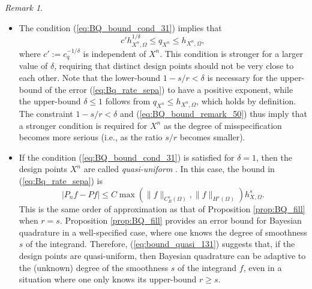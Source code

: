 \documentclass[11pt]{article}
\theoremstyle{remark}
\newtheorem{remark}{Remark}
\theoremstyle{example}
\theoremstyle{remark}
\begin{document}
\begin{remark} \rm
\begin{itemize}
\item The condition (\ref{eq:BQ_bound_cond_31}) implies that
\begin{equation} \label{eq:BQ_bound_remark_50}
c' h_{X^n,\Omega}^{1/\delta} \leq q_{X^n} \leq h_{X^n,\Omega},
\end{equation}
where $c' := c_q^{-1/\delta}$ is independent of $X^n$.
This condition is stronger for a larger value of $\delta$, requiring that distinct design points should not be very close to each other.
Note that the lower-bound $1-s/r<\delta$ is necessary for the upper-bound of the error (\ref{eq:Bq_rate_sepa}) to have a positive exponent, while the upper-bound $\delta \leq 1$ follows from $q_{X^n} \leq h_{X^n,\Omega}$, which holds by definition.
The constraint $1-s/r<\delta$ and (\ref{eq:BQ_bound_remark_50}) thus imply that a stronger condition is required for $X^n$ as the degree of misspecification becomes more serious (i.e., as the ratio $s/r$ becomes smaller).\vspace{-1mm}

\item 
If the condition (\ref{eq:BQ_bound_cond_31}) is satisfied for $\delta = 1$, then the design points $X^n$ are called {\em quasi-uniform} \cite[Section 7.3]{SchWen06}. 
In this case, the bound in (\ref{eq:Bq_rate_sepa}) is  
\begin{equation} \label{eq:bound_quasi_131}
| P_n f - Pf | \leq C  \max \left(  \| f \|_{C_B^s(\Omega)}, \| f \|_{H^s(\Omega)}  \right)  h_{X,\Omega}^s.
\end{equation}
This is the same order of approximation as that of Proposition \ref{prop:BQ_fill} when $r = s$.
Proposition \ref{prop:BQ_fill} provides an error bound for Bayesian quadrature in a well-specified case, where one knows the degree of smoothness $s$ of the integrand. 
Therefore, (\ref{eq:bound_quasi_131}) suggests that, if the design points are quasi-uniform, then Bayesian quadrature can be adaptive to the (unknown) degree of the smoothness $s$ of the integrand $f$, even in a situation where one only knows its upper-bound $r \geq s$.


\end{itemize}%
\end{remark}
\end{document}

